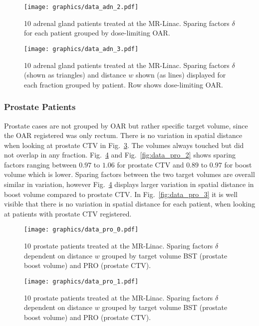 \documentclass[\relativeRoot/ada.tex]{subfiles}
\begin{document}
\begin{figure}[!htb]
    \centering
    \texttt{[image: graphics/data\_adn\_2.pdf]}
    \caption{10 adrenal gland patients treated at the MR-Linac. Sparing factors $\delta$ for each patient grouped by dose-limiting OAR.}
    \label{fig:data_adn_2}
\end{figure}

\begin{figure}[!htb]
    \centering
    \texttt{[image: graphics/data\_adn\_3.pdf]}
    \caption{10 adrenal gland patients treated at the MR-Linac. Sparing factors $\delta$ (shown as triangles) and distance $w$ shown (as lines) displayed for each fraction grouped by patient. Row shows dose-limiting OAR.}
    \label{fig:data_adn_3}
\end{figure}

\subsubsection{Prostate Patients}

Prostate cases are not grouped by OAR but rather specific target volume, since the OAR registered was only rectum. There is no variation in spatial distance when looking at prostate CTV in Fig.~\ref{fig:data_pro_0}. The volumes always touched but did not overlap in any fraction. Fig.~\ref{fig:data_pro_1} and Fig.~\ref{fig:data_pro_2} shows sparing factors ranging between $0.97$ to $1.06$ for prostate CTV and $0.89$ to $0.97$ for boost volume which is lower. Sparing factors between the two target volumes are overall similar in variation, however Fig.~\ref{fig:data_pro_1} displays larger variation in spatial distance in boost volume compared to prostate CTV. In Fig.~\ref{fig:data_pro_3} it is well visible that there is no variation in spatial distance for each patient, when looking at patients with prostate CTV registered.

\begin{figure}[!htb]
    \centering
    \texttt{[image: graphics/data\_pro\_0.pdf]}
    \caption{10 prostate patients treated at the MR-Linac. Sparing factors $\delta$ dependent on distance $w$ grouped by target volume BST (prostate boost volume) and PRO (prostate CTV).}
    \label{fig:data_pro_0}
\end{figure}

\begin{figure}[!htb]
    \centering
    \texttt{[image: graphics/data\_pro\_1.pdf]}
    \caption{10 prostate patients treated at the MR-Linac. Sparing factors $\delta$ dependent on distance $w$ grouped by target volume BST (prostate boost volume) and PRO (prostate CTV).}
    \label{fig:data_pro_1}
\end{figure}
\end{document}
